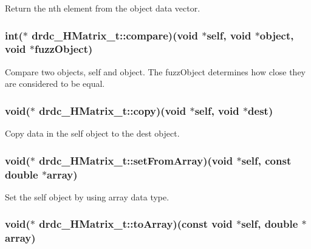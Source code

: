 Return the nth element from the object data vector. 

\hypertarget{structdrdc__HMatrix__t_c17f29dbfcfdc85c5f88459e4fac271b}{
\subsubsection[compare]{\setlength{\rightskip}{0pt plus 5cm}int($\ast$ {\bf drdc\_\-HMatrix\_\-t::compare})(void $\ast$self, void $\ast$object, void $\ast$fuzzObject)}}
\label{structdrdc__HMatrix__t_c17f29dbfcfdc85c5f88459e4fac271b}


Compare two objects, self and object. The fuzzObject determines how close they are considered to be equal. 

\hypertarget{structdrdc__HMatrix__t_ca44c3cfeb886b90f0f2af83ddee3e19}{
\subsubsection[copy]{\setlength{\rightskip}{0pt plus 5cm}void($\ast$ {\bf drdc\_\-HMatrix\_\-t::copy})(void $\ast$self, void $\ast$dest)}}
\label{structdrdc__HMatrix__t_ca44c3cfeb886b90f0f2af83ddee3e19}


Copy data in the self object to the dest object. 

\hypertarget{structdrdc__HMatrix__t_75b930c8a51cd0fa0a163ca2313d1221}{
\subsubsection[setFromArray]{\setlength{\rightskip}{0pt plus 5cm}void($\ast$ {\bf drdc\_\-HMatrix\_\-t::setFromArray})(void $\ast$self, const double $\ast$array)}}
\label{structdrdc__HMatrix__t_75b930c8a51cd0fa0a163ca2313d1221}


Set the self object by using array data type. 

\hypertarget{structdrdc__HMatrix__t_7643f359a9607a1ea958c471726d1bd9}{
\subsubsection[toArray]{\setlength{\rightskip}{0pt plus 5cm}void($\ast$ {\bf drdc\_\-HMatrix\_\-t::toArray})(const void $\ast$self, double $\ast$array)}}
\label{structdrdc__HMatrix__t_7643f359a9607a1ea958c471726d1bd9}


